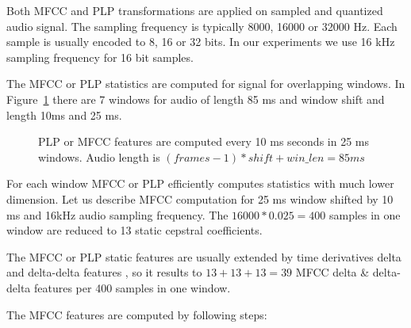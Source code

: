 Both \ac{MFCC} and \ac{PLP} transformations are applied on sampled and quantized audio signal.
The sampling frequency is typically 8000, 16000 or 32000 Hz.
Each sample is usually encoded to 8, 16 or 32 bits. 
In our experiments we use 16 kHz sampling frequency for 16 bit samples.  

The \ac{MFCC} or \ac{PLP} statistics are computed for signal for overlapping windows.
In Figure~\ref{fig:mfcc_window} there are 7 windows 
for audio of length 85 ms and window shift and length 10ms and 25 ms.

\begin{figure}[!htp]
    \begin{center}
    
    \caption{\ac{PLP} or \ac{MFCC} features are computed every 10 ms seconds in 25 ms windows.
    Audio length is $(frames-1)*shift + win\_len = 85ms$}
    \label{fig:mfcc_window} 
    \end{center}
\end{figure}

For each window \ac{MFCC} or \ac{PLP} efficiently computes statistics with much lower dimension. 
Let us describe \ac{MFCC} computation for 25 ms window shifted by 10 ms and 16kHz audio sampling frequency. 
The $16000 * 0.025 = 400$ samples in one window are reduced to 13 static cepstral coefficients.

The \ac{MFCC} or \ac{PLP} static features are usually extended 
by time derivatives delta and delta-delta features \cite{psutka2001comparison},
so it results to $13 + 13 + 13 = 39$ \ac{MFCC} delta \& delta-delta features 
per 400 samples in one window.

The \ac{MFCC} features are computed by following steps:


